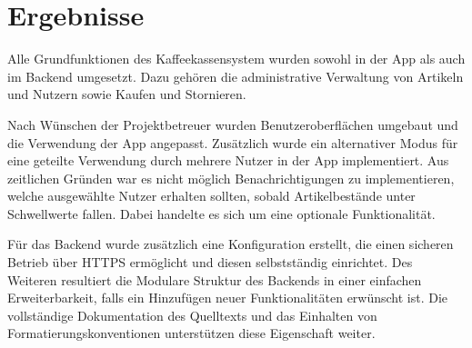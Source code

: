 \section{Ergebnisse}
\label{sec:results}
Alle Grundfunktionen des Kaffeekassensystem wurden sowohl in der App als auch im Backend umgesetzt.
Dazu gehören die administrative Verwaltung von Artikeln und Nutzern sowie Kaufen und Stornieren.

Nach Wünschen der Projektbetreuer wurden Benutzeroberflächen umgebaut und die Verwendung der App angepasst.
Zusätzlich wurde ein alternativer Modus für eine geteilte Verwendung durch mehrere Nutzer in der App implementiert.
Aus zeitlichen Gründen war es nicht möglich Benachrichtigungen zu implementieren, welche ausgewählte Nutzer erhalten sollten, sobald Artikelbestände unter Schwellwerte fallen.
Dabei handelte es sich um eine optionale Funktionalität.

Für das Backend wurde zusätzlich eine Konfiguration erstellt, die einen sicheren Betrieb über HTTPS ermöglicht und diesen selbstständig einrichtet.
Des Weiteren resultiert die Modulare Struktur des Backends in einer einfachen Erweiterbarkeit, falls ein Hinzufügen neuer Funktionalitäten erwünscht ist.
Die vollständige Dokumentation des Quelltexts und das Einhalten von Formatierungskonventionen unterstützen diese Eigenschaft weiter.
